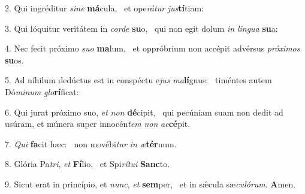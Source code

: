 2. Qui ingréditur \textit{si}\textit{ne} \textbf{má}cula, \ast\  et ope\textit{rá}\textit{tur} \textit{jus}\textbf{tí}tiam:\

3. Qui lóquitur veritátem in \textit{cor}\textit{de} \textbf{su}o, \ast\  qui non egit dolum \textit{in} \textit{lin}\textit{gua} \textbf{su}a:\

4. Nec fecit próximo \textit{su}\textit{o} \textbf{ma}lum, \ast\  et oppróbrium non accépit advérsus \textit{pró}\textit{xi}\textit{mos} \textbf{su}os.\

5. Ad níhilum dedúctus est in conspéctu e\textit{jus} \textit{ma}\textbf{lí}gnus: \ast\  timéntes autem Dó\textit{mi}\textit{num} \textit{glo}\textbf{rí}ficat:\

6. Qui jurat próximo suo, \textit{et} \textit{non} \textbf{dé}cipit, \ast\  qui pecúniam suam non dedit ad usúram, et múnera super innocén\textit{tem} \textit{non} \textit{ac}\textbf{cé}pit.\

7. \textit{Qui} \textbf{fa}cit hæc: \ast\  non movébi\textit{tur} \textit{in} \textit{æ}\textbf{tér}num.\

8. Glória Pa\textit{tri}, \textit{et} \textbf{Fí}lio, \ast\  et Spi\textit{rí}\textit{tu}\textit{i} \textbf{Sanc}to.\

9. Sicut erat in princípio, et \textit{nunc}, \textit{et} \textbf{sem}per, \ast\  et in sǽcula sæ\textit{cu}\textit{ló}\textit{rum}. \textbf{A}men.\

